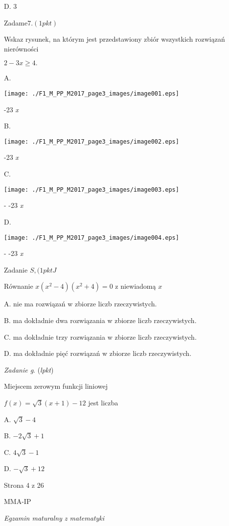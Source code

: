\documentclass[a4paper,12pt]{article}
\begin{document}
D. 3

Zadam$\mathrm{e}7. (1pkt)$

Wskaz rysunek, na którym jest przedstawiony zbiór wszystkich rozwiązań nierówności

$2-3x\geq 4.$

A.
\begin{center}
\texttt{[image: ./F1\_M\_PP\_M2017\_page3\_images/image001.eps]}
\end{center}
-23  {\it x}

B.
\begin{center}
\texttt{[image: ./F1\_M\_PP\_M2017\_page3\_images/image002.eps]}
\end{center}
-23  {\it x}

C.
\begin{center}
\texttt{[image: ./F1\_M\_PP\_M2017\_page3\_images/image003.eps]}
\end{center}
- -23  {\it x}

D.
\begin{center}
\texttt{[image: ./F1\_M\_PP\_M2017\_page3\_images/image004.eps]}
\end{center}
- -23  {\it x}

Zadanie $S, (1pktJ$

Równanie $x(x^{2}-4)(x^{2}+4)=0$ z niewiadomą $x$

A. nie ma rozwiązań w zbiorze liczb rzeczywistych.

B. ma dokładnie dwa rozwiązania w zbiorze liczb rzeczywistych.

C. ma dokładnie trzy rozwiązania w zbiorze liczb rzeczywistych.

D. ma dokładnie pięć rozwiązań w zbiorze liczb rzeczywistych.

{\it Zadanie g}. ({\it lpkt})

Miejscem zerowym funkcji liniowej

$f(x)=\sqrt{3}(x+1)-12$ jest liczba

A. $\sqrt{3}-4$

B. $-2\sqrt{3}+1$

C. $4\sqrt{3}-1$

D. $-\sqrt{3}+12$

Strona 4 z 26

MMA-IP





{\it Egzamin maturalny z matematyki}
\end{document}
